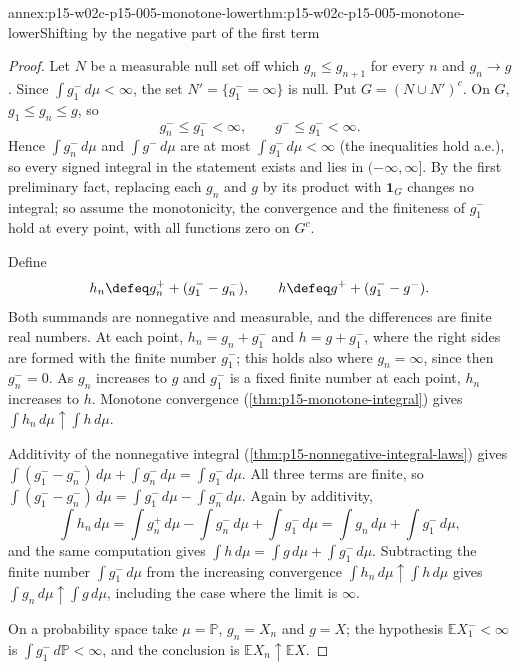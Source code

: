 \begin{annexitem}{annex:p15-w02c-p15-005-monotone-lower}{thm:p15-w02c-p15-005-monotone-lower}{Shifting by the negative part of the first term}
\begin{proof}
Let \(N\) be a measurable null set off which \(g_n\leq g_{n+1}\) for
every \(n\) and \(g_n\to g\). Since \(\int g_1^-\,d\mu<\infty\), the
set \(N'=\{g_1^-=\infty\}\) is null. Put \(G=(N\cup N')^c\). On \(G\),
\(g_1\leq g_n\leq g\), so
\[
 g_n^-\leq g_1^-<\infty,\qquad g^-\leq g_1^-<\infty .
\]
Hence \(\int g_n^-\,d\mu\) and \(\int g^-\,d\mu\) are at most
\(\int g_1^-\,d\mu<\infty\) (the inequalities hold a.e.), so every
signed integral in the statement exists and lies in
\((-\infty,\infty]\). By the first preliminary fact, replacing each
\(g_n\) and \(g\) by its product with \(\mathbf1_G\) changes no
integral; so assume the monotonicity, the convergence and the
finiteness of \(g_1^-\) hold at every point, with all functions zero on
\(G^c\).

Define
\[
 h_n\defeq g_n^++(g_1^--g_n^-),\qquad h\defeq g^++(g_1^--g^-).
\]
Both summands are nonnegative and measurable, and the differences are
finite real numbers. At each point, \(h_n=g_n+g_1^-\) and
\(h=g+g_1^-\), where the right sides are formed with the finite number
\(g_1^-\); this holds also where \(g_n=\infty\), since then
\(g_n^-=0\). As \(g_n\) increases to \(g\) and \(g_1^-\) is a fixed
finite number at each point, \(h_n\) increases to \(h\). Monotone
convergence (\cref{thm:p15-monotone-integral}) gives
\(\int h_n\,d\mu\uparrow\int h\,d\mu\).

Additivity of the nonnegative integral
(\cref{thm:p15-nonnegative-integral-laws}) gives
\(\int(g_1^--g_n^-)\,d\mu+\int g_n^-\,d\mu=\int g_1^-\,d\mu\). All three
terms are finite, so
\(\int(g_1^--g_n^-)\,d\mu=\int g_1^-\,d\mu-\int g_n^-\,d\mu\). Again by
additivity,
\[
 \int h_n\,d\mu=\int g_n^+\,d\mu-\int g_n^-\,d\mu+\int g_1^-\,d\mu
 =\int g_n\,d\mu+\int g_1^-\,d\mu,
\]
and the same computation gives
\(\int h\,d\mu=\int g\,d\mu+\int g_1^-\,d\mu\). Subtracting the finite
number \(\int g_1^-\,d\mu\) from the increasing convergence
\(\int h_n\,d\mu\uparrow\int h\,d\mu\) gives
\(\int g_n\,d\mu\uparrow\int g\,d\mu\), including the case where the
limit is \(\infty\).

On a probability space take \(\mu=\mathbb P\), \(g_n=X_n\) and
\(g=X\); the hypothesis \(\mathbb EX_1^-<\infty\) is
\(\int g_1^-\,d\mathbb P<\infty\), and the conclusion is
\(\mathbb EX_n\uparrow\mathbb EX\).
\end{proof}
\end{annexitem}

